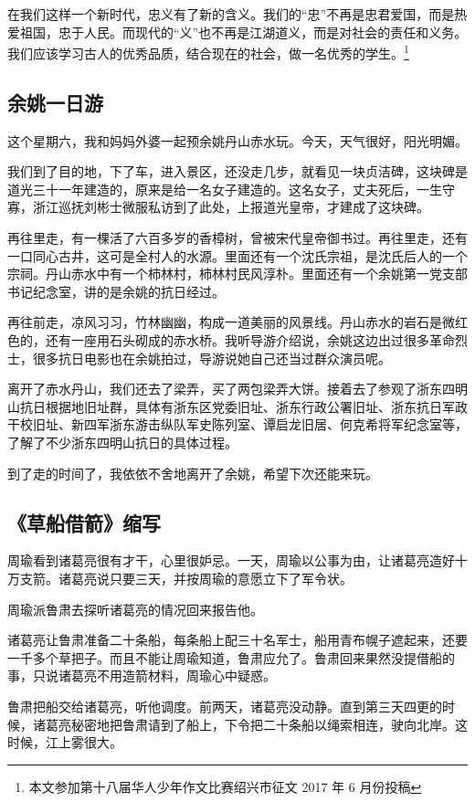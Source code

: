 \documentclass[UTF8,a4paper,titlepage,twoside,10.5pt]{article}
\begin{document}
在我们这样一个新时代，忠义有了新的含义。我们的“忠”不再是忠君爱国，而是热爱祖国，忠于人民。而现代的“义”也不再是江湖道义，而是对社会的责任和义务。我们应该学习古人的优秀品质，结合现在的社会，做一名优秀的学生。\footnote{本文参加第十八届华人少年作文比赛绍兴市征文 2017 年 6 月份投稿}

\subsection{余姚一日游}
\label{sec:org4dec262}

这个星期六，我和妈妈外婆一起预余姚丹山赤水玩。今天，天气很好，阳光明媚。

我们到了目的地，下了车，进入景区，还没走几步，就看见一块贞洁碑，这块碑是道光三十一年建造的，原来是给一名女子建造的。这名女子，丈夫死后，一生守寡，浙江巡抚刘彬士微服私访到了此处，上报道光皇帝，才建成了这块碑。

再往里走，有一棵活了六百多岁的香樟树，曾被宋代皇帝御书过。再往里走，还有一口同心古井，这可是全村人的水源。里面还有一个沈氏宗祖，是沈氏后人的一个宗祠。丹山赤水中有一个柿林村，柿林村民风淳朴。里面还有一个余姚第一党支部书记纪念室，讲的是余姚的抗日经过。

再往前走，凉风习习，竹林幽幽，构成一道美丽的风景线。丹山赤水的岩石是微红色的，还有一座用石头砌成的赤水桥。我听导游介绍说，余姚这边出过很多革命烈士，很多抗日电影也在余姚拍过，导游说她自己还当过群众演员呢。

离开了赤水丹山，我们还去了梁弄，买了两包梁弄大饼。接着去了参观了浙东四明山抗日根据地旧址群，具体有浙东区党委旧址、浙东行政公署旧址、浙东抗日军政干校旧址、新四军浙东游击纵队军史陈列室、谭启龙旧居、何克希将军纪念室等，了解了不少浙东四明山抗日的具体过程。

到了走的时间了，我依依不舍地离开了余姚，希望下次还能来玩。

\subsection{《草船借箭》缩写}
\label{sec:org20f9ca6}

周瑜看到诸葛亮很有才干，心里很妒忌。一天，周瑜以公事为由，让诸葛亮造好十万支箭。诸葛亮说只要三天，并按周瑜的意愿立下了军令状。

周瑜派鲁肃去探听诸葛亮的情况回来报告他。

诸葛亮让鲁肃准备二十条船，每条船上配三十名军士，船用青布幌子遮起来，还要一千多个草把子。而且不能让周瑜知道，鲁肃应允了。鲁肃回来果然没提借船的事，只说诸葛亮不用造箭材料，周瑜心中疑惑。

鲁肃把船交给诸葛亮，听他调度。前两天，诸葛亮没动静。直到第三天四更的时候，诸葛亮秘密地把鲁肃请到了船上，下令把二十条船以绳索相连，驶向北岸。这时候，江上雾很大。
\end{document}
